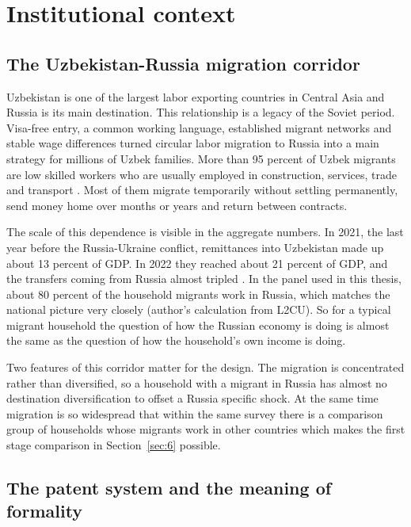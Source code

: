 \section{Institutional context}\label{sec:3}

\subsection{The Uzbekistan-Russia migration corridor}\label{sec:3-1}

Uzbekistan is one of the largest labor exporting countries in Central Asia and Russia is its main destination. This relationship is a legacy of the Soviet period. Visa-free entry, a common working language, established migrant networks and stable wage differences turned circular labor migration to Russia into a main strategy for millions of Uzbek families. More than 95 percent of Uzbek migrants are low skilled workers who are usually employed in construction, services, trade and transport \parencite{bossavie2024journey}. Most of them migrate temporarily without settling permanently, send money home over months or years and return between contracts.

The scale of this dependence is visible in the aggregate numbers. In 2021, the last year before the Russia-Ukraine conflict, remittances into Uzbekistan made up about 13 percent of GDP. In 2022 they reached about 21 percent of GDP, and the transfers coming from Russia almost tripled \parencite{worldbank2023}. In the panel used in this thesis, about 80 percent of the household migrants work in Russia, which matches the national picture very closely (author's calculation from L2CU). So for a typical migrant household the question of how the Russian economy is doing is almost the same as the question of how the household's own income is doing.

Two features of this corridor matter for the design. The migration is concentrated rather than diversified, so a household with a migrant in Russia has almost no destination diversification to offset a Russia specific shock. At the same time migration is so widespread that within the same survey there is a comparison group of households whose migrants work in other countries which makes the first stage comparison in Section~\ref{sec:6} possible.

\subsection{The patent system and the meaning of formality}\label{sec:3-2}

